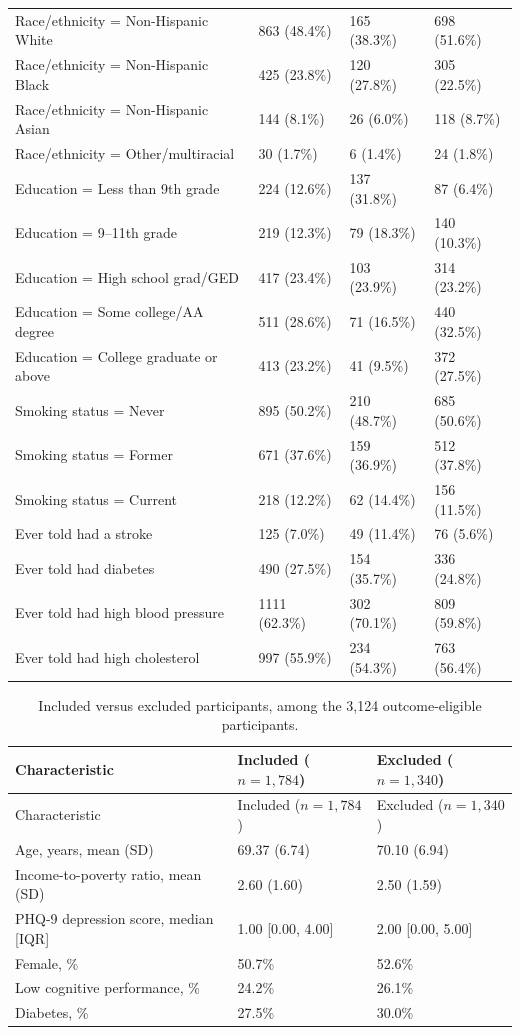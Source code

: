 \documentclass[12pt]{article}
\begin{document}
\begin{longtable}{p{6.6cm}R{2.6cm}R{2.6cm}R{2.6cm}}
Race/ethnicity = Non-Hispanic White & 863 (48.4\%) & 165 (38.3\%) & 698 (51.6\%) \\
Race/ethnicity = Non-Hispanic Black & 425 (23.8\%) & 120 (27.8\%) & 305 (22.5\%) \\
Race/ethnicity = Non-Hispanic Asian & 144 (8.1\%) & 26 (6.0\%) & 118 (8.7\%) \\
Race/ethnicity = Other/multiracial & 30 (1.7\%) & 6 (1.4\%) & 24 (1.8\%) \\
Education = Less than 9th grade & 224 (12.6\%) & 137 (31.8\%) & 87 (6.4\%) \\
Education = 9--11th grade & 219 (12.3\%) & 79 (18.3\%) & 140 (10.3\%) \\
Education = High school grad/GED & 417 (23.4\%) & 103 (23.9\%) & 314 (23.2\%) \\
Education = Some college/AA degree & 511 (28.6\%) & 71 (16.5\%) & 440 (32.5\%) \\
Education = College graduate or above & 413 (23.2\%) & 41 (9.5\%) & 372 (27.5\%) \\
Smoking status = Never & 895 (50.2\%) & 210 (48.7\%) & 685 (50.6\%) \\
Smoking status = Former & 671 (37.6\%) & 159 (36.9\%) & 512 (37.8\%) \\
Smoking status = Current & 218 (12.2\%) & 62 (14.4\%) & 156 (11.5\%) \\
Ever told had a stroke & 125 (7.0\%) & 49 (11.4\%) & 76 (5.6\%) \\
Ever told had diabetes & 490 (27.5\%) & 154 (35.7\%) & 336 (24.8\%) \\
Ever told had high blood pressure & 1111 (62.3\%) & 302 (70.1\%) & 809 (59.8\%) \\
Ever told had high cholesterol & 997 (55.9\%) & 234 (54.3\%) & 763 (56.4\%) \\
\end{longtable}

\bigskip

\begin{longtable}{p{6.0cm}R{3.5cm}R{3.5cm}}
\caption{Included versus excluded participants, among the 3,124 outcome-eligible participants.}
\label{tab:t1b}\\
\toprule
Characteristic & Included ($n=1{,}784$) & Excluded ($n=1{,}340$) \\
\midrule
\endfirsthead
\toprule
Characteristic & Included ($n=1{,}784$) & Excluded ($n=1{,}340$) \\
\midrule
\endhead
\bottomrule
\endlastfoot
Age, years, mean (SD) & 69.37 (6.74) & 70.10 (6.94) \\
Income-to-poverty ratio, mean (SD) & 2.60 (1.60) & 2.50 (1.59) \\
PHQ-9 depression score, median [IQR] & 1.00 [0.00, 4.00] & 2.00 [0.00, 5.00] \\
Female, \% & 50.7\% & 52.6\% \\
Low cognitive performance, \% & 24.2\% & 26.1\% \\
Diabetes, \% & 27.5\% & 30.0\% \\
\end{longtable}
\end{document}
